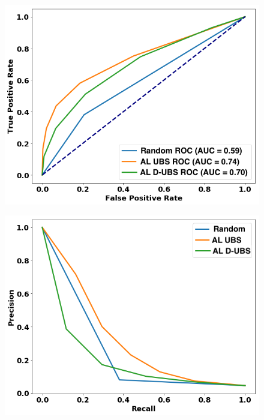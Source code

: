 \begin{figure}
\centering
\begin{minipage}[b]{.4\textwidth}
\includegraphics[trim=0in 0.1in 0.1in 0.in,clip,width=1.0\textwidth]{figures/rocs_round5_new.png}
\captionsetup{labelformat=empty}
\label{fig:rocs_round5}
\end{minipage}\qquad
\hspace{2ex}
\begin{minipage}[b]{.4\textwidth}
\includegraphics[trim=0in 0.1in 0.1in 0.in,clip,width=1.0\textwidth]{figures/prcs_round5_rule.png}

\end{minipage}
\end{figure}
